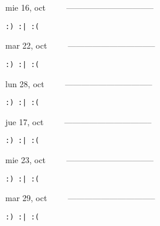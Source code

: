 \documentclass[letterpaper,10pt]{article}
\begin{document}
\begin{multicols}{3}
{mie 16, oct\ \ \ \ \ --------------------------------}
\begin{flushright}\begin{small}\texttt{:) :| :(}\end{small}\end{flushright}
\vfill
{mar 22, oct\ \ \ \ \ --------------------------------}
\begin{flushright}\begin{small}\texttt{:) :| :(}\end{small}\end{flushright}\par
\vfill
{lun 28, oct\ \ \ \ \ --------------------------------}
\begin{flushright}\begin{small}\texttt{:) :| :(}\end{small}\end{flushright}\par
\vfill
\end{multicols}
\vspace{1.05cm}

\begin{multicols}{3}
{jue 17, oct\ \ \ \ \ --------------------------------}
\begin{flushright}\begin{small}\texttt{:) :| :(}\end{small}\end{flushright}
\vfill
{mie 23, oct\ \ \ \ \ --------------------------------}
\begin{flushright}\begin{small}\texttt{:) :| :(}\end{small}\end{flushright}\par
\vfill
{mar 29, oct\ \ \ \ \ --------------------------------}
\begin{flushright}\begin{small}\texttt{:) :| :(}\end{small}\end{flushright}\par
\vfill
\end{multicols}
\vspace{1.05cm}
\end{document}
